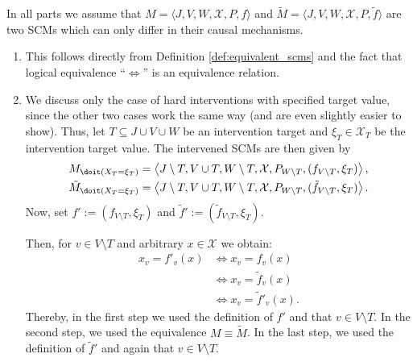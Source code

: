 \begin{enumerate}
  \begin{ungradedsolution}
    In all parts we assume that $M = \langle J, V, W, \mathcal{X}, P, f \rangle$ and $\tilde{M} = \langle J, V, W, \mathcal{X}, P, \tilde{f} \rangle$ are two SCMs which can only differ in their causal mechanisms.
    \begin{enumerate}
      \item This follows directly from Definition \ref*{def:equivalent_scms} and the fact that logical equivalence ``$\Longleftrightarrow$'' is an equivalence relation.
      \item We discuss only the case of hard interventions with specified target value, since the other two cases work the same way (and are even slightly easier to show).
      Thus, let $T \subseteq J \cup V \cup W$ be an intervention target and $\xi_{T} \in \mathcal{X}_T$ be the intervention target value.
      The intervened SCMs are then given by
      \begin{align*}
        M_{\doit(X_T = \xi_T)} = \left\langle J \setminus T, V \cup T, W \setminus T, \mathcal{X}, P_{W \setminus T}, (f_{V \setminus T}, \xi_T) \right\rangle, \\
        \tilde{M}_{\doit(X_T = \xi_T)} = \left\langle J \setminus T, V \cup T, W \setminus T, \mathcal{X}, P_{W \setminus T}, (\tilde{f}_{V \setminus T}, \xi_T) \right\rangle.
      \end{align*}
      Now, set $f' := (f_{V \setminus T}, \xi_T)$ and $\tilde{f}' := (\tilde{f}_{V \setminus T}, \xi_T)$.

      Then, for $v \in V \setminus T$ and arbitrary $x \in \mathcal{X}$ we obtain:
      \begin{align*}
        x_v = f'_v(x) & \Longleftrightarrow x_v = f_v(x)           \\
                      & \Longleftrightarrow x_v = \tilde{f}_v(x)   \\
                      & \Longleftrightarrow x_v = \tilde{f}'_v(x).
      \end{align*}
      Thereby, in the first step we used the definition of $f'$ and that $v \in V \setminus T$.
      In the second step, we used the equivalence $M \equiv \tilde{M}$.
      In the last step, we used the definition of $\tilde{f}'$ and again that $v \in V \setminus T$.


\end{enumerate}
\end{ungradedsolution}
\end{enumerate}
